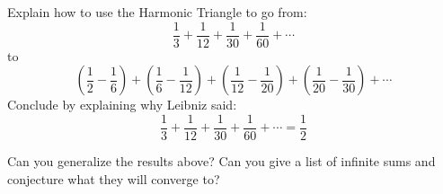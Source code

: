 \begin{prob} Explain how to use the Harmonic Triangle to go from:
\[
\frac{1}{3} + \frac{1}{12} + \frac{1}{30} + \frac{1}{60}+\cdots 
\]
to
\[
\left(\frac{1}{2} - \frac{1}{6}\right) + \left(\frac{1}{6}-\frac{1}{12}\right) + 
\left(\frac{1}{12}- \frac{1}{20}\right) + \left(\frac{1}{20}-\frac{1}{30}\right) + \cdots 
\]
Conclude by explaining why Leibniz said:
\[
\frac{1}{3} + \frac{1}{12} + \frac{1}{30} + \frac{1}{60}+\cdots = \frac{1}{2}
\]
\end{prob}

\begin{prob} 
Can you generalize the results above? Can you give a list of infinite
sums and conjecture what they will converge to?
\end{prob}





